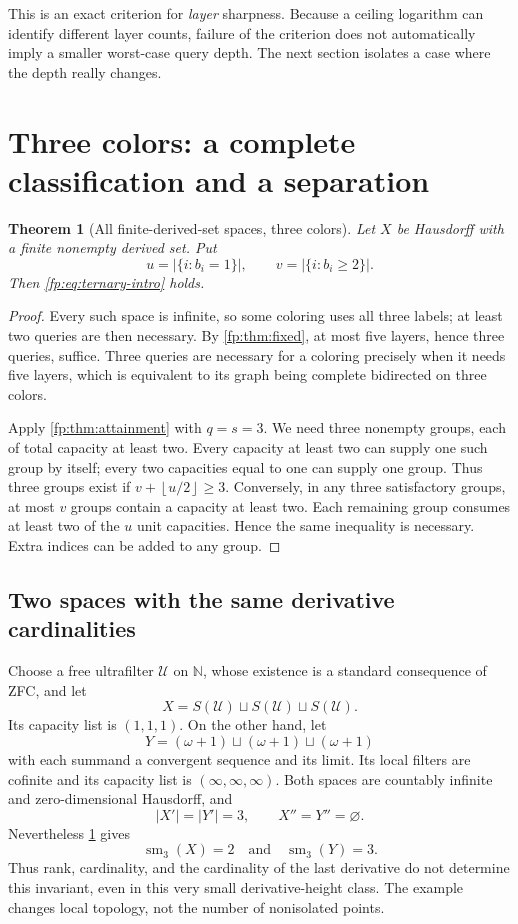 \documentclass[11pt,letterpaper]{article}
\numberwithin{equation}{section}
\newtheorem{theorem}{Theorem}[section]
\theoremstyle{definition}
\theoremstyle{remark}
\theoremstyle{definition}
\newcommand{\sm}{\operatorname{sm}}
\newcommand{\N}{\mathbb N}
\newcommand{\U}{\mathcal U}
\newcommand{\floor}[1]{\left\lfloor #1\right\rfloor}
\newcommand{\sq}{\mathbin{\sqcup}}
\begin{document}
This is an exact criterion for \emph{layer} sharpness. Because a ceiling
logarithm can identify different layer counts, failure of the criterion
does not automatically imply a smaller worst-case query depth. The next
section isolates a case where the depth really changes.

\section{Three colors: a complete classification and a separation}
\label{fp:sec:ternary}

\begin{theorem}[All finite-derived-set spaces, three colors]\label{fp:thm:ternary}
Let \(X\) be Hausdorff with a finite nonempty derived set. Put
\[
 u=|\{i:b_i=1\}|,\qquad v=|\{i:b_i\geq2\}|.
\]
Then \cref{fp:eq:ternary-intro} holds.
\end{theorem}
\begin{proof}
Every such space is infinite, so some coloring uses all three labels;
at least two queries are then necessary. By \cref{fp:thm:fixed}, at most
five layers, hence three queries, suffice. Three queries are necessary
for a coloring precisely when it needs five layers, which is equivalent
to its graph being complete bidirected on three colors.

Apply \cref{fp:thm:attainment} with \(q=s=3\). We need three nonempty
groups, each of total capacity at least two. Every capacity at least two
can supply one such group by itself; every two capacities equal to one
can supply one group. Thus three groups exist if
\(v+\floor{u/2}\geq3\). Conversely, in any three satisfactory groups,
at most \(v\) groups contain a capacity at least two. Each remaining
group consumes at least two of the \(u\) unit capacities. Hence the
same inequality is necessary. Extra indices can be added to any group.
\end{proof}

\subsection{Two spaces with the same derivative cardinalities}

Choose a free ultrafilter \(\U\) on \(\N\), whose existence is a
standard consequence of ZFC, and let
\[
 X=S(\U)\sq S(\U)\sq S(\U).
\]
Its capacity list is \((1,1,1)\). On the other hand, let
\[
 Y=(\omega+1)\sq(\omega+1)\sq(\omega+1)
\]
with each summand a convergent sequence and its limit. Its local filters
are cofinite and its capacity list is \((\infty,\infty,\infty)\).
Both spaces are countably infinite and zero-dimensional Hausdorff, and
\[
 |X'|=|Y'|=3,\qquad X''=Y''=\varnothing.
\]
Nevertheless \cref{fp:thm:ternary} gives
\begin{equation}\label{fp:eq:separation}
 \boxed{\sm_3(X)=2\quad\text{and}\quad\sm_3(Y)=3.}
\end{equation}
Thus rank, cardinality, and the cardinality of the last derivative do not
determine this invariant, even in this very small derivative-height class.
The example changes local topology, not the number of nonisolated points.
\end{document}
